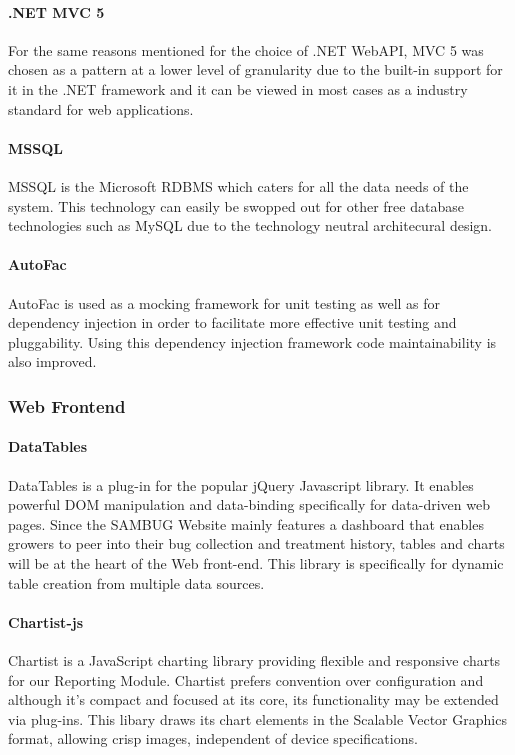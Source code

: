 \documentclass[11pt,a4paper,titlepage]{article}
\begin{document}
			\paragraph{.NET MVC 5}
				For the same reasons mentioned for the choice of .NET WebAPI, MVC 5 was chosen as a pattern at a lower level of granularity due to the built-in support for it in the .NET framework and it can be viewed in most cases as a industry standard for web applications.
			\paragraph{MSSQL}
					MSSQL is the Microsoft RDBMS which caters for all the data needs of the system. This technology can easily be swopped out for other free database technologies such as MySQL due to the technology neutral architecural design.
			\paragraph{AutoFac}
					AutoFac is used as a mocking framework for unit testing as well as for dependency injection in order to facilitate more effective unit testing and pluggability. Using this dependency injection framework code maintainability is also improved.
		\subsubsection{Web Frontend}
			\paragraph{DataTables}
				DataTables is a plug-in for the popular jQuery Javascript library. It enables powerful DOM manipulation and data-binding specifically for data-driven web pages. Since the SAMBUG Website mainly features a dashboard that enables growers to peer into their bug collection and treatment history, tables and charts will be at the heart of the Web front-end. This library is specifically for dynamic table creation from multiple data sources.
			\paragraph{Chartist-js}
				Chartist is a JavaScript charting library providing flexible and responsive charts for our Reporting Module. Chartist prefers convention over configuration and although it's compact and focused at its core, its functionality may be extended via plug-ins. This libary draws its chart elements in the Scalable Vector Graphics format, allowing crisp images, independent of device specifications. 
\end{document}
